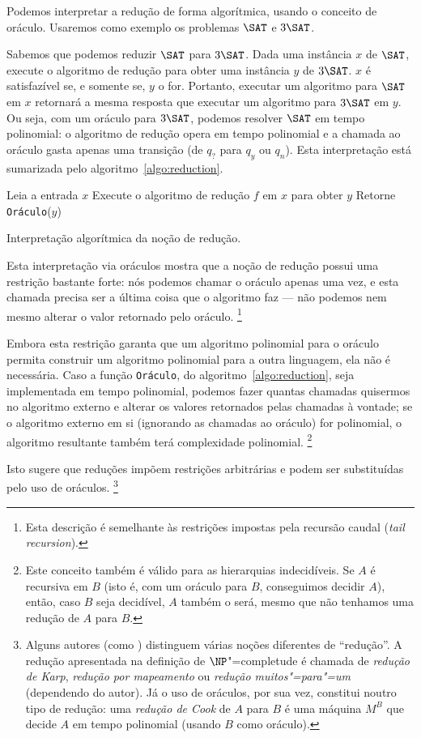 Podemos interpretar a redução de forma algorítmica,
usando o conceito de oráculo.
Usaremos como exemplo os problemas $\SAT$ e $3\SAT$.

Sabemos que podemos reduzir $\SAT$ para $3\SAT$.
Dada uma instância $x$ de $\SAT$,
execute o algoritmo de redução para obter uma instância $y$ de $3\SAT$.
$x$ é satisfazível se, e somente se, $y$ o for.
Portanto, executar um algoritmo para $\SAT$ em $x$
retornará a mesma resposta
que executar um algoritmo para $3\SAT$ em $y$.
Ou seja, com um oráculo para $3\SAT$,
podemos resolver $\SAT$ em tempo polinomial:
o algoritmo de redução opera em tempo polinomial
e a chamada ao oráculo gasta apenas uma transição
(de $q_?$ para $q_y$ ou $q_n$).
Esta interpretação está sumarizada pelo algoritmo~\ref{algo:reduction}.

\begin{algorithm}[h]
    Leia a entrada $x$\;
    Execute o algoritmo de redução $f$ em $x$ para obter $y$\;
    Retorne \texttt{Oráculo}($y$)\;
    \caption{
        Interpretação algorítmica da noção de redução.
    }
    \label{algo:reduction}
\end{algorithm}

Esta interpretação via oráculos mostra que
a noção de redução possui uma restrição bastante forte:
nós podemos chamar o oráculo apenas uma vez,
e esta chamada precisa ser a última coisa que o algoritmo faz
--- não podemos nem mesmo alterar o valor retornado pelo oráculo.%
\footnote{
    Esta descrição é semelhante às restrições impostas pela recursão caudal
    (\emph{tail recursion}).
}

Embora esta restrição garanta que
um algoritmo polinomial para o oráculo
permita construir um algoritmo polinomial para a outra linguagem,
ela não é necessária.
Caso a função \texttt{Oráculo}, do algoritmo~\ref{algo:reduction},
seja implementada em tempo polinomial,
podemos fazer quantas chamadas quisermos no algoritmo externo
e alterar os valores retornados pelas chamadas à vontade;
se o algoritmo externo em si
(ignorando as chamadas ao oráculo)
for polinomial,
o algoritmo resultante também terá complexidade polinomial.%
\footnote{
    Este conceito também é válido para as hierarquias indecidíveis.
    Se $A$ é recursiva em $B$
    (isto é, com um oráculo para $B$, conseguimos decidir $A$),
    então, caso $B$ seja decidível,
    $A$ também o será,
    mesmo que não tenhamos uma redução de $A$ para $B$.
}

Isto sugere que reduções impõem restrições arbitrárias
e podem ser substituídas pelo uso de oráculos.%
\footnote{
    Alguns autores (como )
    distinguem várias noções diferentes de ``redução''.
    A redução apresentada na definição de $\NP$"=completude
    é chamada de \emph{redução de Karp},
    \emph{redução por mapeamento} ou \emph{redução muitos"=para"=um}
    (dependendo do autor).
    Já o uso de oráculos, por sua vez, constitui noutro tipo de redução:
    uma \emph{redução de Cook} de $A$ para $B$
    é uma máquina $M^B$ que decide $A$ em tempo polinomial
    (usando $B$ como oráculo).
}
